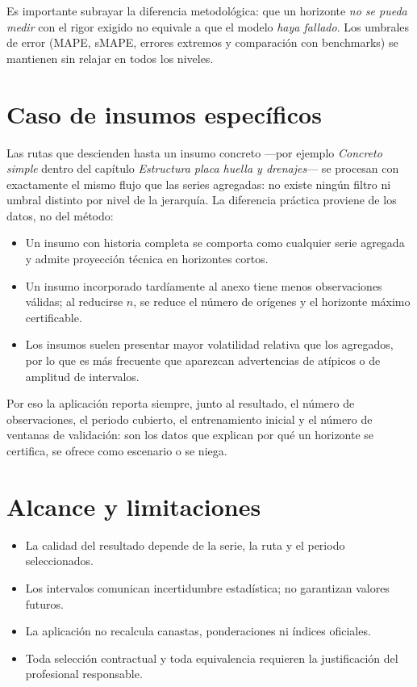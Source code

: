 \documentclass[11pt,letterpaper]{article}
\begin{document}
Es importante subrayar la diferencia metodológica: que un horizonte
\emph{no se pueda medir} con el rigor exigido no equivale a que el modelo
\emph{haya fallado}. Los umbrales de error (MAPE, sMAPE, errores extremos y
comparación con benchmarks) se mantienen sin relajar en todos los niveles.

\section{Caso de insumos específicos}

Las rutas que descienden hasta un insumo concreto ---por ejemplo
\textit{Concreto simple} dentro del capítulo \textit{Estructura placa huella y
drenajes}--- se procesan con exactamente el mismo flujo que las series
agregadas: no existe ningún filtro ni umbral distinto por nivel de la
jerarquía. La diferencia práctica proviene de los datos, no del método:

\begin{itemize}
  \item Un insumo con historia completa se comporta como cualquier serie agregada y admite proyección técnica en horizontes cortos.
  \item Un insumo incorporado tardíamente al anexo tiene menos observaciones válidas; al reducirse \(n\), se reduce el número de orígenes y el horizonte máximo certificable.
  \item Los insumos suelen presentar mayor volatilidad relativa que los agregados, por lo que es más frecuente que aparezcan advertencias de atípicos o de amplitud de intervalos.
\end{itemize}

Por eso la aplicación reporta siempre, junto al resultado, el número de
observaciones, el periodo cubierto, el entrenamiento inicial y el número de
ventanas de validación: son los datos que explican por qué un horizonte se
certifica, se ofrece como escenario o se niega.

\section{Alcance y limitaciones}

\begin{itemize}
  \item La calidad del resultado depende de la serie, la ruta y el periodo seleccionados.
  \item Los intervalos comunican incertidumbre estadística; no garantizan valores futuros.
  \item La aplicación no recalcula canastas, ponderaciones ni índices oficiales.
  \item Toda selección contractual y toda equivalencia requieren la justificación del profesional responsable.
\end{itemize}
\end{document}
